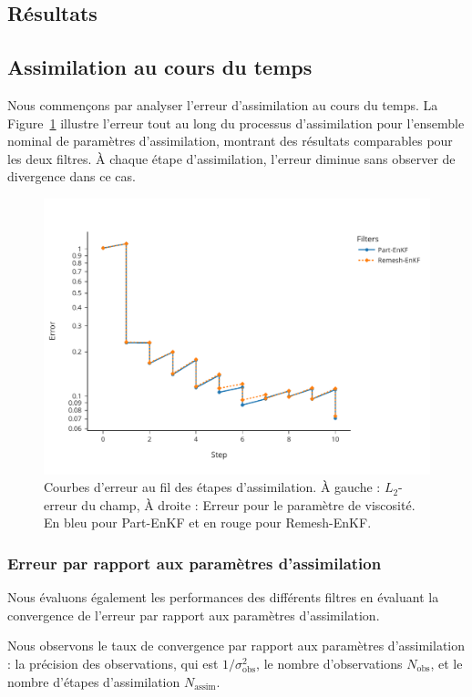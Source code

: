 \subsection{Résultats}

\subsection{Assimilation au cours du temps}

Nous commençons par analyser l'erreur d'assimilation au cours du temps. La Figure~\ref{fig:assim_time} illustre l'erreur tout au long du processus d'assimilation pour l'ensemble nominal de paramètres d'assimilation, montrant des résultats comparables pour les deux filtres. À chaque étape d'assimilation, l'erreur diminue sans observer de divergence dans ce cas.

\begin{figure}[htbp]
    \centering
    \includegraphics*[width=0.7\linewidth]{images/app2d/final/error_in_time.pdf}
    \caption{Courbes d'erreur au fil des étapes d'assimilation. À gauche : \(L_2\)-erreur du champ, À droite : Erreur pour le paramètre de viscosité. En bleu pour Part-EnKF et en rouge pour Remesh-EnKF.}
    \label{fig:assim_time}
\end{figure}

\subsubsection{Erreur par rapport aux paramètres d'assimilation}

Nous évaluons également les performances des différents filtres en évaluant la convergence de l'erreur par rapport aux paramètres d'assimilation.

Nous observons le taux de convergence par rapport aux paramètres d'assimilation : la précision des observations, qui est \(1/\sigma_{\text{obs}}^2\), le nombre d'observations \(N_{\text{obs}}\), et le nombre d'étapes d'assimilation \(N_{\text{assim}}\).

